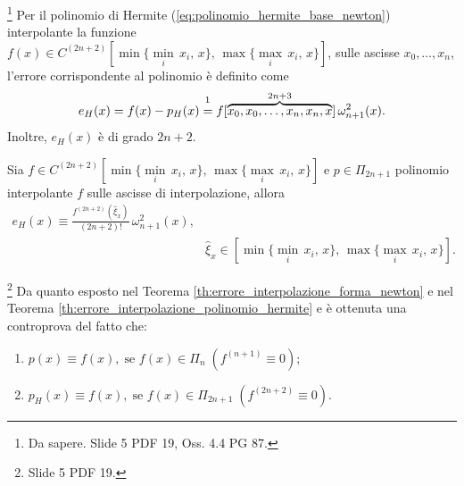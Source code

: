 \begin{theorem}\label{th:errore_interpolazione_polinomio_hermite}
    \footnote{Da sapere. Slide 5 PDF 19, Oss. 4.4 PG 87.}
    Per il polinomio di Hermite (\ref{eq:polinomio_hermite_base_newton}) interpolante la funzione $f(x)\in C^{(2n+2)}[\min\{\underset{i}{\min}\,x_i,\,x\},\, \max\{\underset{i}{\max}\,x_i,\, x\}]$, sulle ascisse $x_0,\hdots,x_n$, l'errore corrispondente al polinomio è definito come
    \begin{equation}\label{eq:errPolInterHer}
        e_H(x)= f(x)-p_H(x) \overset{\footnotemark}{=} f[\overbrace{x_0,x_0,\hdots,x_n,x_n,x}^{2n+3}]\,\omega^2_{n+1}(x).
    \end{equation}
    Inoltre, $e_H(x)$ è di grado $2n+2$.
\end{theorem}


\begin{remark}
	Sia $f\in C^{(2n+2)}[\min\{\underset{i}{\min}\,x_i,\,x\},\, \max\{\underset{i}{\max}\,x_i,\, x\}]$ e $p\in \Pi_{2n+1}$ polinomio interpolante $f$ sulle ascisse di interpolazione, allora
	\begin{equation}\label{eq:errore_interpolazione_hermite_approssimazione}
		\begin{matrix}
			e_H(x)\equiv\frac{\boxed{f^{(2n+2)}(\widehat\xi_x)}}{(2n+2)!}\,\omega^2_{n+1}(x),&\\
			&\widehat\xi_x\in[\min\{\underset{i}{\min}\,x_i,\,x\},\, \max\{\underset{i}{\max}\,x_i,\, x\}].
		\end{matrix}
	\end{equation}
\end{remark}

\begin{remark}\footnote{Slide 5 PDF 19.}
    Da quanto esposto nel Teorema \ref{th:errore_interpolazione_forma_newton} e nel Teorema \ref{th:errore_interpolazione_polinomio_hermite} e è ottenuta una controprova del fatto che:
    \begin{enumerate}
        \item $p(x)\equiv f(x),\; \text{se } f(x)\in\Pi_n\; \left(f^{(n+1)}\equiv 0\right)$;
        \item $p_H(x)\equiv f(x),\; \text{se } f(x)\in\Pi_{2n+1}\; \left(f^{(2n+2)}\equiv 0\right)$.
    \end{enumerate}
\end{remark}

